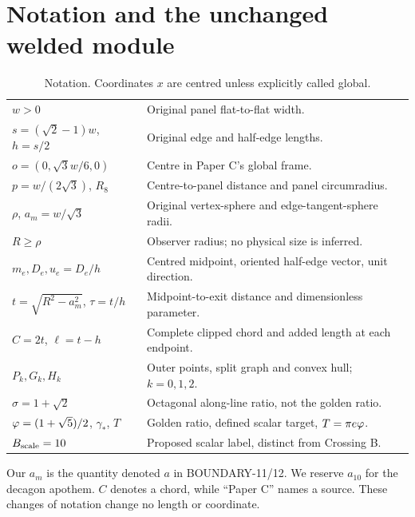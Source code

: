 \documentclass[11pt,a4paper]{article}
\begin{document}
\section{Notation and the unchanged welded module}\label{sec:native}
\begin{table}[ht]\centering\small
\caption{Notation. Coordinates $x$ are centred unless explicitly called global.}\label{tab:notation}
\begin{tabularx}{\linewidth}{@{}lX@{}}\toprule
$w>0$ & Original panel flat-to-flat width.\\
$s=(\sqrt2-1)w$, $h=s/2$ & Original edge and half-edge lengths.\\
$o=(0,\sqrt3w/6,0)$ & Centre in Paper C's global frame.\\
$p=w/(2\sqrt3)$, $R_8$ & Centre-to-panel distance and panel circumradius.\\
$\rho$, $a_m=w/\sqrt3$ & Original vertex-sphere and edge-tangent-sphere radii.\\
$R\geq\rho$ & Observer radius; no physical size is inferred.\\
$m_e,D_e,u_e=D_e/h$ & Centred midpoint, oriented half-edge vector, unit direction.\\
$t=\sqrt{R^2-a_m^2}$, $\tau=t/h$ & Midpoint-to-exit distance and dimensionless parameter.\\
$C=2t$, $\ell=t-h$ & Complete clipped chord and added length at each endpoint.\\
$P_k,G_k,H_k$ & Outer points, split graph and convex hull; $k=0,1,2$.\\
$\sigma=1+\sqrt2$ & Octagonal along-line ratio, not the golden ratio.\\
$\varphi=(1+\sqrt5)/2$, $\gamma_*$, $T$ & Golden ratio, defined scalar target, $T=\pi e\varphi$.\\
$B_{\rm scale}=10$ & Proposed scalar label, distinct from Crossing B.\\\bottomrule
\end{tabularx}
\end{table}
Our $a_m$ is the quantity denoted $a$ in BOUNDARY-11/12. We reserve $a_{10}$ for the decagon apothem. $C$ denotes a chord, while ``Paper C'' names a source. These changes of notation change no length or coordinate.
\end{document}
